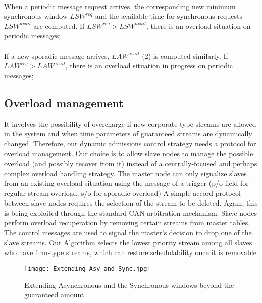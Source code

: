 \documentclass[conference]{IEEEtran}
\begin{document}
 \paragraph{}When a periodic message request arrives, the corresponding new minimum synchronous window $LSW^{req}$ and the available time for synchronous requests $LSW^{avail}$ are computed. If $LSW^{req}>LSW^{avail}$, there is an overload situation on periodic messages; 
 
\paragraph{}If a new sporadic message arrives, $LAW^{avail}$ (2) is computed similarly. If$LAW^{req}>LAW^{avail}$, there is an overload situation in progress on periodic messages;

 

\subsection{Overload management}
It involves the possibility of overcharge if new corporate type streams are allowed in the system and when time parameters of guaranteed streams are dynamically changed. Therefore, our dynamic admissions control strategy needs  a protocol for overload management.
Our choice is to allow slave nodes to manage the possible overload (and possibly recover from it) instead of a centrally-focused and perhaps complex overload handling strategy. The master node can only signalize slaves from an existing overload situation using the message of a trigger (p/o field for regular stream overload, s/o for sporadic overload)
A simple accord protocol between slave nodes requires the selection of the stream to be deleted. Again, this is being exploited through the standard CAN arbitration mechanism. Slave nodes perform overload recuperation by removing certain streams from master tables. The control messages are used to signal the master's decision to drop one of the slave streams. Our Algorithm selects the lowest priority stream among all slaves who have firm-type streams, which can restore schedulability once it is removable.

\begin{figure}[htp]
    \centering
    \texttt{[image: Extending Asy and Sync.jpg]}
    \caption{Extending Asynchronous and the Synchronous windows beyond the guaranteed amount{\cite{1377703}}}
    \label{fig:reg-gen}
\end{figure}
\end{document}
